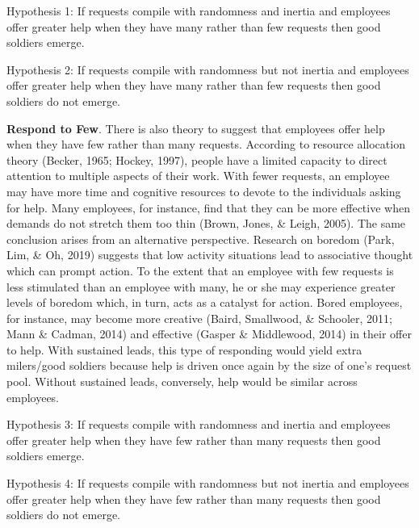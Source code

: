 \documentclass[english,,man]{apa6}
\begin{document}
Hypothesis 1: If requests compile with randomness and inertia and employees offer greater help when they have many rather than few requests then good soldiers emerge.

Hypothesis 2: If requests compile with randomness but not inertia and employees offer greater help when they have many rather than few requests then good soldiers do not emerge.

\textbf{Respond to Few}. There is also theory to suggest that employees offer help when they have few rather than many requests. According to resource allocation theory (Becker, 1965; Hockey, 1997), people have a limited capacity to direct attention to multiple aspects of their work. With fewer requests, an employee may have more time and cognitive resources to devote to the individuals asking for help. Many employees, for instance, find that they can be more effective when demands do not stretch them too thin (Brown, Jones, \& Leigh, 2005). The same conclusion arises from an alternative perspective. Research on boredom (Park, Lim, \& Oh, 2019) suggests that low activity situations lead to associative thought which can prompt action. To the extent that an employee with few requests is less stimulated than an employee with many, he or she may experience greater levels of boredom which, in turn, acts as a catalyst for action. Bored employees, for instance, may become more creative (Baird, Smallwood, \& Schooler, 2011; Mann \& Cadman, 2014) and effective (Gasper \& Middlewood, 2014) in their offer to help. With sustained leads, this type of responding would yield extra milers/good soldiers because help is driven once again by the size of one's request pool. Without sustained leads, conversely, help would be similar across employees.

Hypothesis 3: If requests compile with randomness and inertia and employees offer greater help when they have few rather than many requests then good soldiers emerge.

Hypothesis 4: If requests compile with randomness but not inertia and employees offer greater help when they have few rather than many requests then good soldiers do not emerge.
\end{document}
